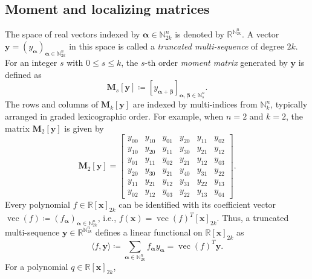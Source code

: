 \documentclass[pdflatex,sn-mathphys-num]{sn-jnl}%
\newcommand{\re}{\mathbb{R}}
\newcommand{\vect}[1]{\boldsymbol{#1}}
\newcommand{\mat}[1]{\boldsymbol{#1}}
\theoremstyle{thmstyleone}%
\theoremstyle{thmstyletwo}%
\theoremstyle{thmstylethree}%
\begin{document}
\subsection{Moment and localizing matrices}
\label{ssc:momloc}

The space of real vectors indexed by $\vect{\alpha} \in \mathbb{N}_{2k}^n$ 
is denoted by $\mathbb{R}^{\mathbb{N}_{2k}^n}$. 
A vector $\vect{y} = (y_{\vect{\alpha}})_{\vect{\alpha} \in \mathbb{N}_{2k}^n}$ 
in this space is called a \textit{truncated multi-sequence} of degree $2k$.
For an integer $s$ with $0\le s\le k$, 
the $s$-th order \textit{moment matrix} generated by $\vect{y}$ is defined as
\begin{equation*}
	\mat{M}_{s}[\vect{y}] \coloneqq
	[y_{\vect{\alpha}+\vect{\beta}}]_{\vect{\alpha},\vect{\beta}\in\mathbb{N}_{s}^n}.
\end{equation*}
The rows and columns of $\mat{M}_k[\vect{y}]$ are indexed by multi-indices 
from $\mathbb{N}_{k}^n$, typically arranged in graded lexicographic order.
For example, when $n = 2$ and $k = 2$, the matrix $\mat{M}_2[\vect{y}]$ is given by
\begin{equation*}
	\mat{M}_2[\vect{y}] = \begin{bmatrix}
		y_{00} & y_{10} & y_{01} & y_{20} & y_{11} & y_{02} \\
		y_{10} & y_{20} & y_{11} & y_{30} & y_{21} & y_{12} \\
		y_{01} & y_{11} & y_{02} & y_{21} & y_{12} & y_{03} \\
		y_{20} & y_{30} & y_{21} & y_{40} & y_{31} & y_{22} \\
		y_{11} & y_{21} & y_{12} & y_{31} & y_{22} & y_{13} \\
		y_{02} & y_{12} & y_{03} & y_{22} & y_{13} & y_{04}
	\end{bmatrix}.
\end{equation*}
Every polynomial $f\in\re[\vect{x}]_{2k}$ can be identified with its coefficient vector
$\operatorname{vec}(f) \coloneqq
(f_{\vect{\alpha}})_{\vect{\alpha}\in \mathbb{N}_{2k}^n}$,
i.e., $f(\vect{x}) =  \operatorname{vec}(f)^T[\vect{x}]_{2k}$. 
Thus, a truncated multi-sequence $\vect{y} \in \mathbb{R}^{\mathbb{N}_{2k}^n}$ defines a 
linear functional on $\mathbb{R}[\vect{x}]_{2k}$ as
\begin{equation}\label{eq:bilinear}
	\langle f, \vect{y} \rangle \coloneqq 
	\sum_{\vect{\alpha} \in \mathbb{N}_{2k}^n}
	f_{\vect{\alpha}}y_{\vect{\alpha}}
	= \operatorname{vec}(f)^T \vect{y}.
\end{equation}
For a polynomial $q \in \mathbb{R}[\vect{x}]_{2k}$, 
\end{document}
